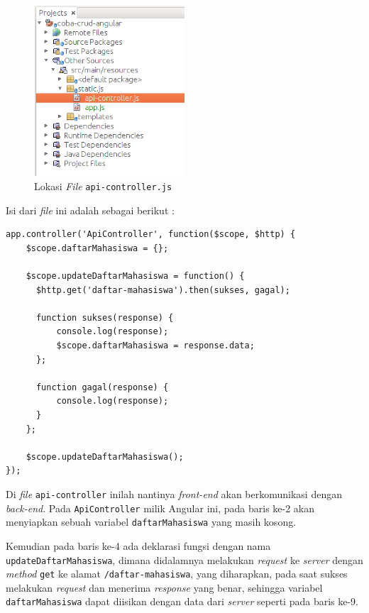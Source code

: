 \begin{enumerate}
	\begin{figure}[H]
		\centering
		\includegraphics[width=0.5\textwidth]{./resources/030-lokasi-api-controller-js}
		\caption{Lokasi \textit{File} \texttt{api-controller.js}}
		\label{fig:lokasi-api-controller-js}
	\end{figure}
	
	Isi dari \textit{file} ini adalah sebagai berikut :
	
	\begin{lstlisting}
app.controller('ApiController', function($scope, $http) {
    $scope.daftarMahasiswa = {};
    
    $scope.updateDaftarMahasiswa = function() {
      $http.get('daftar-mahasiswa').then(sukses, gagal);
      
      function sukses(response) {
          console.log(response);
          $scope.daftarMahasiswa = response.data;
      };
      
      function gagal(response) {
          console.log(response);
      }
    };
    
    $scope.updateDaftarMahasiswa();
});
	\end{lstlisting}
	
	Di \textit{file} \texttt{api-controller} inilah nantinya \textit{front-end} akan berkomunikasi dengan \textit{back-end}. Pada \texttt{ApiController} milik Angular ini, pada baris ke-2 akan menyiapkan sebuah variabel \texttt{daftarMahasiswa} yang masih kosong.
	
	Kemudian pada baris ke-4 ada deklarasi fungsi dengan nama \texttt{updateDaftarMahasiswa}, dimana didalamnya melakukan \textit{request} ke \textit{server} dengan \textit{method} \texttt{get} ke alamat \texttt{/daftar-mahasiswa}, yang diharapkan, pada saat sukses melakukan \textit{request} dan menerima \textit{response} yang benar, sehingga variabel \texttt{daftarMahasiswa} dapat diisikan dengan data dari \textit{server} seperti pada baris ke-9.
	

\end{enumerate}
